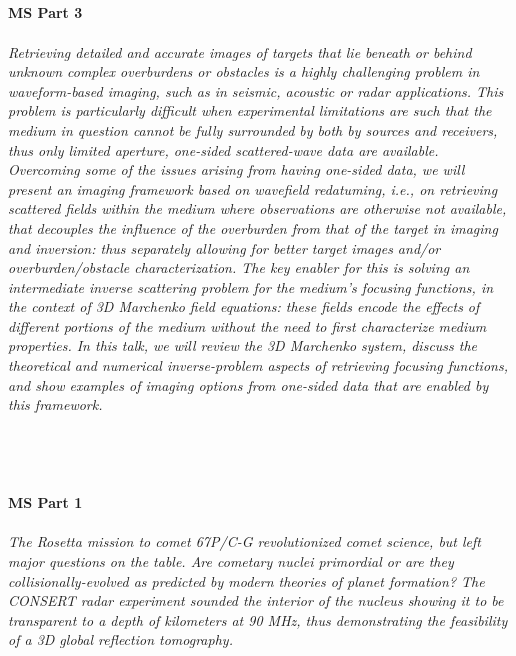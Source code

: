 \begin{multicols}{2}
\\ 
    \\
    \\\\
    \noindent\textbf{MS Part 3}\\
\\  
    \textit{Retrieving detailed and accurate images of targets that lie beneath or behind unknown complex overburdens or obstacles is a highly challenging problem in waveform-based imaging, such as in seismic, acoustic or radar applications. This problem is particularly difficult when experimental limitations are such that the medium in question cannot be fully surrounded by both by sources and receivers, thus only limited aperture, one-sided  scattered-wave data are available. Overcoming some of the issues arising from having one-sided data, we will present an imaging framework based on wavefield redatuming, i.e., on retrieving scattered fields within the medium where observations are otherwise not available, that decouples the influence of the overburden from that of the target in imaging and inversion: thus separately allowing for better target images and/or overburden/obstacle characterization.  The key enabler for this is solving an intermediate inverse scattering problem for the medium’s focusing functions, in the context of 3D Marchenko field equations: these fields encode the effects of different portions of the medium without the need to first characterize medium properties. In this talk, we will review the 3D Marchenko system, discuss the theoretical and numerical inverse-problem aspects of retrieving focusing functions, and show examples of imaging options from one-sided data that are enabled by this framework. }\\
\\ 
    \\
    \\\\
    \noindent\textbf{MS Part 1}\\
\\  
    \textit{The Rosetta mission to comet 67P/C-G revolutionized comet science, but left major questions on the table. Are cometary nuclei primordial or are they collisionally-evolved as predicted by modern theories of planet formation? The CONSERT radar experiment sounded the interior of the nucleus showing it to be transparent to a depth of kilometers at 90 MHz, thus demonstrating the feasibility of a 3D global reflection tomography.
}
\end{multicols}
